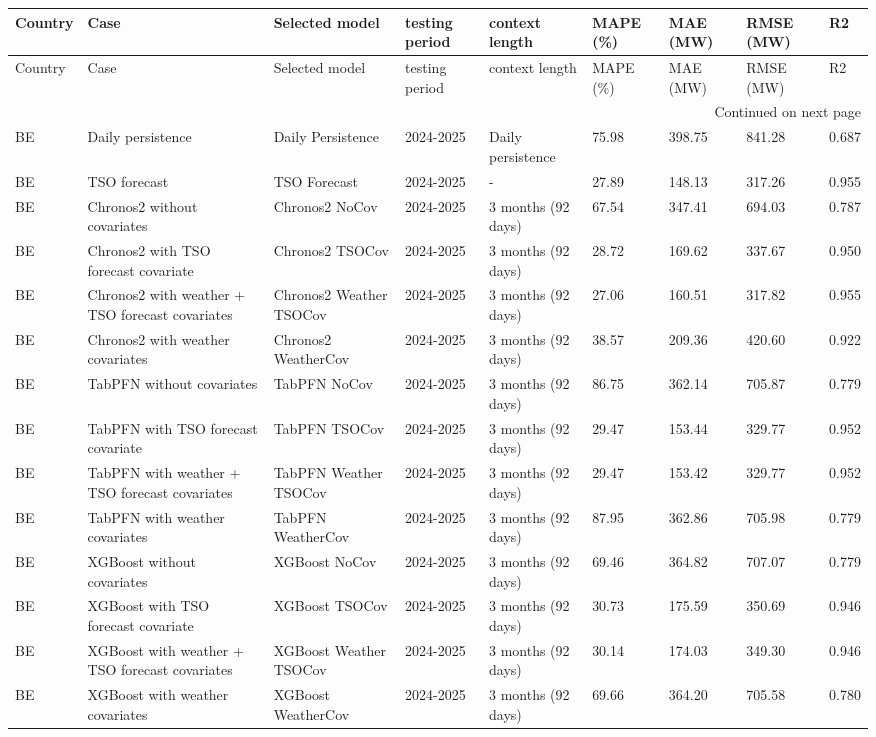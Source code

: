 \begin{longtable}{lllllllll}
\toprule
Country & Case & Selected model & testing period & context length & MAPE (\%) & MAE (MW) & RMSE (MW) & R2 \\
\midrule
\endfirsthead
\toprule
Country & Case & Selected model & testing period & context length & MAPE (\%) & MAE (MW) & RMSE (MW) & R2 \\
\midrule
\endhead
\midrule
\multicolumn{9}{r}{Continued on next page} \\
\midrule
\endfoot
\bottomrule
\endlastfoot
BE & Daily persistence & Daily Persistence & 2024-2025 & Daily persistence & 75.98 & 398.75 & 841.28 & 0.687 \\
BE & TSO forecast & TSO Forecast & 2024-2025 & - & 27.89 & 148.13 & 317.26 & 0.955 \\
BE & Chronos2 without covariates & Chronos2 NoCov & 2024-2025 & 3 months (92 days) & 67.54 & 347.41 & 694.03 & 0.787 \\
BE & Chronos2 with TSO forecast covariate & Chronos2 TSOCov & 2024-2025 & 3 months (92 days) & 28.72 & 169.62 & 337.67 & 0.950 \\
BE & Chronos2 with weather + TSO forecast covariates & Chronos2 Weather TSOCov & 2024-2025 & 3 months (92 days) & 27.06 & 160.51 & 317.82 & 0.955 \\
BE & Chronos2 with weather covariates & Chronos2 WeatherCov & 2024-2025 & 3 months (92 days) & 38.57 & 209.36 & 420.60 & 0.922 \\
BE & TabPFN without covariates & TabPFN NoCov & 2024-2025 & 3 months (92 days) & 86.75 & 362.14 & 705.87 & 0.779 \\
BE & TabPFN with TSO forecast covariate & TabPFN TSOCov & 2024-2025 & 3 months (92 days) & 29.47 & 153.44 & 329.77 & 0.952 \\
BE & TabPFN with weather + TSO forecast covariates & TabPFN Weather TSOCov & 2024-2025 & 3 months (92 days) & 29.47 & 153.42 & 329.77 & 0.952 \\
BE & TabPFN with weather covariates & TabPFN WeatherCov & 2024-2025 & 3 months (92 days) & 87.95 & 362.86 & 705.98 & 0.779 \\
BE & XGBoost without covariates & XGBoost NoCov & 2024-2025 & 3 months (92 days) & 69.46 & 364.82 & 707.07 & 0.779 \\
BE & XGBoost with TSO forecast covariate & XGBoost TSOCov & 2024-2025 & 3 months (92 days) & 30.73 & 175.59 & 350.69 & 0.946 \\
BE & XGBoost with weather + TSO forecast covariates & XGBoost Weather TSOCov & 2024-2025 & 3 months (92 days) & 30.14 & 174.03 & 349.30 & 0.946 \\
BE & XGBoost with weather covariates & XGBoost WeatherCov & 2024-2025 & 3 months (92 days) & 69.66 & 364.20 & 705.58 & 0.780 \\
\end{longtable}
